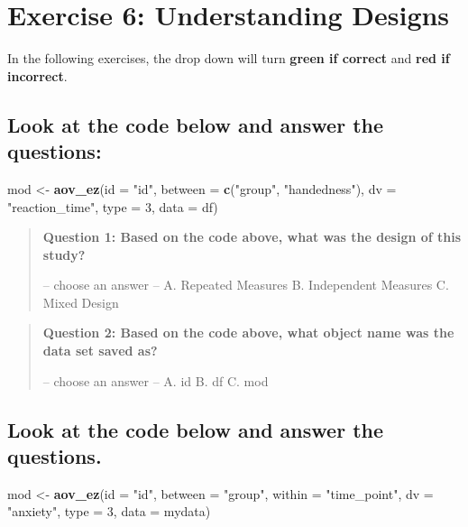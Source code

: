 \documentclass[
]{book}
\newenvironment{Shaded}{\begin{snugshade}}{\end{snugshade}}
\newcommand{\AttributeTok}[1]{\textcolor[rgb]{0.13,0.29,0.53}{#1}}
\newcommand{\DecValTok}[1]{\textcolor[rgb]{0.00,0.00,0.81}{#1}}
\newcommand{\FunctionTok}[1]{\textcolor[rgb]{0.13,0.29,0.53}{\textbf{#1}}}
\newcommand{\NormalTok}[1]{#1}
\newcommand{\OtherTok}[1]{\textcolor[rgb]{0.56,0.35,0.01}{#1}}
\newcommand{\StringTok}[1]{\textcolor[rgb]{0.31,0.60,0.02}{#1}}
\let\oldsection\section
\renewcommand{\section}{\needspace{5\baselineskip}\oldsection}
\let\oldsubsection\subsection
\renewcommand{\subsection}{\needspace{3\baselineskip}\oldsubsection}  %
\begin{document}
\section{Exercise 6: Understanding Designs}\label{exercise-6-understanding-designs}

In the following exercises, the drop down will turn \textbf{green if correct} and \textbf{red if incorrect}.

\subsection{Look at the code below and answer the questions:}\label{look-at-the-code-below-and-answer-the-questions}

\begin{Shaded}
\begin{Highlighting}[]
\NormalTok{mod }\OtherTok{\textless{}{-}} \FunctionTok{aov\_ez}\NormalTok{(}\AttributeTok{id =} \StringTok{"id"}\NormalTok{,}
              \AttributeTok{between =} \FunctionTok{c}\NormalTok{(}\StringTok{"group"}\NormalTok{, }\StringTok{"handedness"}\NormalTok{), }
              \AttributeTok{dv =} \StringTok{"reaction\_time"}\NormalTok{, }
              \AttributeTok{type =} \DecValTok{3}\NormalTok{,}
              \AttributeTok{data =}\NormalTok{ df)}
\end{Highlighting}
\end{Shaded}

\begin{quote}
\textbf{Question 1: Based on the code above, what was the design of this study?}

-- choose an answer -- A. Repeated Measures B. Independent Measures C. Mixed Design
\end{quote}

\begin{quote}
\textbf{Question 2: Based on the code above, what object name was the data set saved as?}

-- choose an answer -- A. id B. df C. mod
\end{quote}

\subsection{Look at the code below and answer the questions.}\label{look-at-the-code-below-and-answer-the-questions.}

\begin{Shaded}
\begin{Highlighting}[]
\NormalTok{mod }\OtherTok{\textless{}{-}} \FunctionTok{aov\_ez}\NormalTok{(}\AttributeTok{id =} \StringTok{"id"}\NormalTok{,}
              \AttributeTok{between =} \StringTok{"group"}\NormalTok{,}
              \AttributeTok{within =} \StringTok{"time\_point"}\NormalTok{,}
              \AttributeTok{dv =} \StringTok{"anxiety"}\NormalTok{, }
              \AttributeTok{type =} \DecValTok{3}\NormalTok{,}
              \AttributeTok{data =}\NormalTok{ mydata)}
\end{Highlighting}
\end{Shaded}
\end{document}
